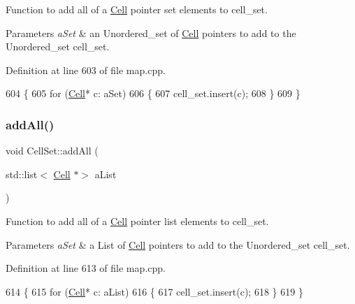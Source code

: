 Function to add all of a \hyperlink{class_cell}{Cell} pointer set elements to cell\+\_\+set. 


\begin{DoxyParams}{Parameters}
{\em a\+Set} & an Unordered\+\_\+set of \hyperlink{class_cell}{Cell} pointers to add to the Unordered\+\_\+set cell\+\_\+set. \\
\hline
\end{DoxyParams}


Definition at line 603 of file map.\+cpp.


\begin{DoxyCode}
604 \{
605     \textcolor{keywordflow}{for} (\hyperlink{class_cell}{Cell}* c: aSet)
606     \{
607         cell\_set.insert(c);
608     \}
609 \}
\end{DoxyCode}
\hypertarget{class_cell_set_a0d3c7fe4074fff58db2bf6932bf20ab0}{}\label{class_cell_set_a0d3c7fe4074fff58db2bf6932bf20ab0} 
\subsubsection{\texorpdfstring{add\+All()}{addAll()}\hspace{0.1cm}{\footnotesize\ttfamily [2/2]}}
{\footnotesize\ttfamily void Cell\+Set\+::add\+All (\begin{DoxyParamCaption}\item[{std\+::list$<$ \hyperlink{class_cell}{Cell} $\ast$$>$}]{a\+List }\end{DoxyParamCaption})}



Function to add all of a \hyperlink{class_cell}{Cell} pointer list elements to cell\+\_\+set. 


\begin{DoxyParams}{Parameters}
{\em a\+Set} & a List of \hyperlink{class_cell}{Cell} pointers to add to the Unordered\+\_\+set cell\+\_\+set. \\
\hline
\end{DoxyParams}


Definition at line 613 of file map.\+cpp.


\begin{DoxyCode}
614 \{
615     \textcolor{keywordflow}{for} (\hyperlink{class_cell}{Cell}* c: aList)
616     \{
617         cell\_set.insert(c);
618     \}
619 \}
\end{DoxyCode}
\hypertarget{class_cell_set_aaf42eb737301463a3ebf6a86c13a7dc4}{}\label{class_cell_set_aaf42eb737301463a3ebf6a86c13a7dc4} 
